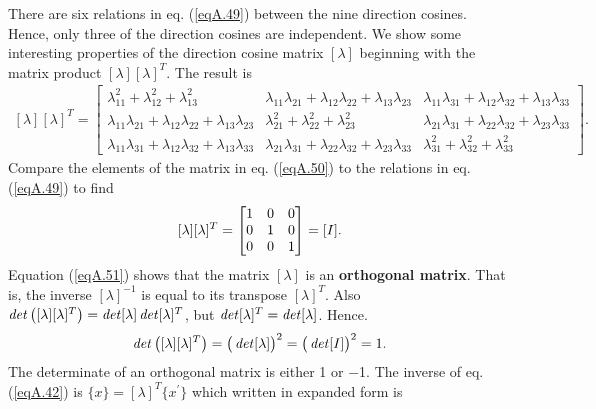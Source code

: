 \documentclass{AeroStructure-ERJohnson}
\begin{document}
There are six relations in eq. (\ref{eqA.49}) between the nine direction cosines. Hence, only three of the direction cosines are independent. We show some interesting properties of the direction cosine matrix $[\lambda]$ beginning with the matrix product $[\lambda][\lambda]^{T}$. The result is
\begin{align}\label{eqA.50}
[\lambda][\lambda]^{T}=\left[\begin{array}{ccc}\lambda_{11}^{2}+\lambda_{12}^{2}+\lambda_{13}^{2} & \lambda_{11} \lambda_{21}+\lambda_{12} \lambda_{22}+\lambda_{13} \lambda_{23} & \lambda_{11} \lambda_{31}+\lambda_{12} \lambda_{32}+\lambda_{13} \lambda_{33} \\[4pt] \lambda_{11} \lambda_{21}+\lambda_{12} \lambda_{22}+\lambda_{13} \lambda_{23} & \lambda_{21}^{2}+\lambda_{22}^{2}+\lambda_{23}^{2} & \lambda_{21} \lambda_{31}+\lambda_{22} \lambda_{32}+\lambda_{23} \lambda_{33} \\[4pt] \lambda_{11} \lambda_{31}+\lambda_{12} \lambda_{32}+\lambda_{13} \lambda_{33} & \lambda_{21} \lambda_{31}+\lambda_{22} \lambda_{32}+\lambda_{23} \lambda_{33} & \lambda_{31}^{2}+\lambda_{32}^{2}+\lambda_{33}^{2}\end{array}\right].
\end{align}
Compare the elements of the matrix in eq. (\ref{eqA.50}) to the relations in eq. (\ref{eqA.49}) to find
\begin{align}\label{eqA.51}
[\lambda][\lambda]^{T}=\left[\begin{array}{@{}lll@{}}1 & 0 & 0 \\0 & 1 & 0 \\0 & 0 & 1\end{array}\right]=[I].
\end{align}
Equation (\ref{eqA.51}) shows that the matrix $[\lambda]$ is an \textbf{orthogonal matrix}. That is, the inverse $[\lambda]^{-1}$ is equal to its transpose $[\lambda]^{T}$. Also $\operatorname{\it det}\left([\lambda][\lambda]^{T}\right)=\operatorname{\it det}[\lambda] \operatorname{\it det}[\lambda]^{T}$, but $\operatorname{\it det}[\lambda]^{T}=\operatorname{\it det}[\lambda]$.   Hence.
\begin{align}\label{eqA.52}
\operatorname{\it det}\big([\lambda][\lambda]^{T}\big)=\big(\operatorname{\it det}[\lambda]\big)^{2}=\big(\operatorname{\it det}[I]\big)^{2}=1.
\end{align}
The determinate of an orthogonal matrix is either 1 or $-$1. The inverse of eq. (\ref{eqA.42}) is $\{x\}=[\lambda]^{T}\{x^{\prime}\}$ which written in expanded form is\vspace*{-6pt}
\end{document}
